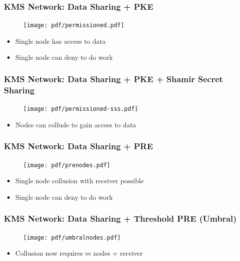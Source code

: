 \documentclass[xetex,mathsans,sans,aspectratio=169]{beamer}
\begin{document}
    \begin{frame}
        \frametitle{KMS Network: Data Sharing + PKE}
        \begin{figure}
            \centering
            \texttt{[image: pdf/permissioned.pdf]}
        \end{figure}
        \begin{itemize}
            \item Single node has access to data
            \item Single node can deny to do work
        \end{itemize}
    \end{frame}

    \begin{frame}
        \frametitle{KMS Network: Data Sharing + PKE + Shamir Secret Sharing}
        \begin{figure}
            \centering
            \texttt{[image: pdf/permissioned-sss.pdf]}
        \end{figure}
        \begin{itemize}
            \item Nodes can collude to gain access to data
        \end{itemize}
    \end{frame}

    \begin{frame}
        \frametitle{KMS Network: Data Sharing + PRE}
        \begin{figure}
            \centering
            \texttt{[image: pdf/prenodes.pdf]}
        \end{figure}
        \begin{itemize}
            \item Single node collusion with receiver possible
            \item Single node can deny to do work
        \end{itemize}
    \end{frame}

    \begin{frame}
        \frametitle{KMS Network: Data Sharing + Threshold PRE (Umbral)}
        \begin{figure}
            \centering
            \texttt{[image: pdf/umbralnodes.pdf]}
        \end{figure}
        \begin{itemize}
            \item Collusion now requires $m$ nodes + receiver
        \end{itemize}
    \end{frame}
\end{document}
